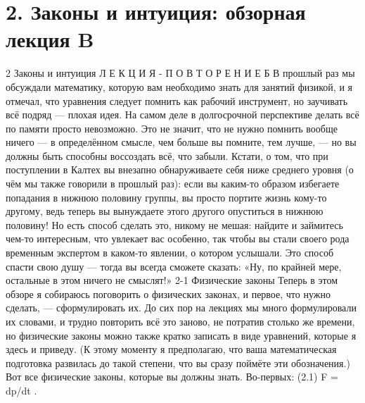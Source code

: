 \documentclass[10pt,oneside]{article}
\begin{document}
\section*{2. Законы и интуиция: обзорная лекция B}
\label{tips-sec-10-2-законы-и-интуиция-обзорная-лекция-b}
2 Законы и интуиция Л Е К Ц И Я - П О В Т О Р Е Н И Е   Б В прошлый раз мы обсуждали математику, которую вам необходимо знать для занятий физикой, и я отмечал, что уравнения следует помнить как рабочий инструмент, но заучивать всё подряд --- плохая идея. На самом деле в долгосрочной перспективе делать всё по памяти просто невозможно. Это не значит, что не нужно помнить вообще ничего --- в определённом смысле, чем больше вы помните, тем лучше, --- но вы должны быть способны воссоздать всё, что забыли. Кстати, о том, что при поступлении в Калтех вы внезапно обнаруживаете себя ниже среднего уровня (о чём мы также говорили в прошлый раз): если вы каким-то образом избегаете попадания в нижнюю половину группы, вы просто портите жизнь кому-то другому, ведь теперь вы вынуждаете этого другого опуститься в нижнюю половину! Но есть способ сделать это, никому не мешая: найдите и займитесь чем-то интересным, что увлекает вас особенно, так чтобы вы стали своего рода временным экспертом в каком-то явлении, о котором услышали. Это способ спасти свою душу --- тогда вы всегда сможете сказать: «Ну, по крайней мере, остальные в этом ничего не смыслят!» 2-1 Физические законы Теперь в этом обзоре я собираюсь поговорить о физических законах, и первое, что нужно сделать, --- сформулировать их. До сих пор на лекциях мы много формулировали их словами, и трудно повторить всё это заново, не потратив столько же времени, но физические законы можно также кратко записать в виде уравнений, которые я здесь и приведу. (К этому моменту я предполагаю, что ваша математическая подготовка развилась до такой степени, что вы сразу поймёте эти обозначения.) Вот все физические законы, которые вы должны знать. Во-первых: (2.1) F = dp/dt .\par
\end{document}
